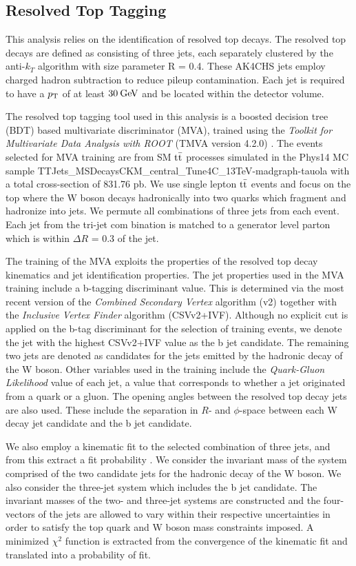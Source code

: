 \subsection{Resolved Top Tagging}
\label{subsec:sel_toptag_resolved}

This analysis relies on the identification of resolved top decays. The resolved top decays are defined as consisting of three jets, each separately clustered by the anti-$k_{T}$ algorithm with size parameter R = 0.4. These AK4CHS jets employ charged hadron subtraction to reduce pileup contamination. Each jet is required to have a $p_\mathrm{T}$ of at least $30\:\mathrm{Ge\kern -0.1em V}$ and be located within the detector volume.

The resolved top tagging tool used in this analysis is a boosted decision tree (BDT) based multivariate discriminator (MVA), trained using the \textit{Toolkit for Multivariate Data Analysis with ROOT} (TMVA version 4.2.0) \cite{tmva}. The events selected for MVA training are from SM $\mathrm{t}\bar{\mathrm{t}}$ processes simulated in the Phys14 MC sample TTJets\_MSDecaysCKM\_central\_Tune4C\_13TeV-madgraph-tauola with a total cross-section of 831.76 pb. We use single lepton $\mathrm{t}\bar{\mathrm{t}}$ events and focus on the top where the W boson decays hadronically into two quarks which fragment and hadronize into jets. We permute all combinations of three jets from each event. Each jet from the tri-jet com bination is matched to a generator level parton which is within $\Delta R$ = 0.3 of the jet. 

The training of the MVA exploits the properties of the resolved top decay kinematics and jet identification properties. The jet properties used in the MVA training include a b-tagging discriminant value. This is determined via the most recent version of the \textit{Combined Secondary Vertex} algorithm (v2) together with the \textit{Inclusive Vertex Finder} algorithm (CSVv2+IVF). Although no explicit cut is applied on the b-tag discriminant for the selection of training events, we denote the jet with the highest CSVv2+IVF value as the b jet candidate. The remaining two jets are denoted as candidates for the jets emitted by the hadronic decay of the W boson. Other variables used in the training include the \textit{Quark-Gluon Likelihood} value of each jet, a value that corresponds to whether a jet originated from a quark or a gluon. The opening angles between the resolved top decay jets are also used. These include the separation in $R$- and $\phi$-space between each W decay jet candidate and the b jet candidate. 

We also employ a kinematic fit to the selected combination of three jets, and from this extract a fit probability \cite{kinfit}. We consider the invariant mass of the system comprised of the two candidate jets for the hadronic decay of the W boson. We also consider the three-jet system which includes the b jet candidate. The invariant masses of the two- and three-jet systems are constructed and the four-vectors of the jets are allowed to vary within their respective uncertainties in order to satisfy the top quark and W boson mass constraints imposed. A minimized $\chi^{2}$ function is extracted from the convergence of the kinematic fit and translated into a probability of fit. 

